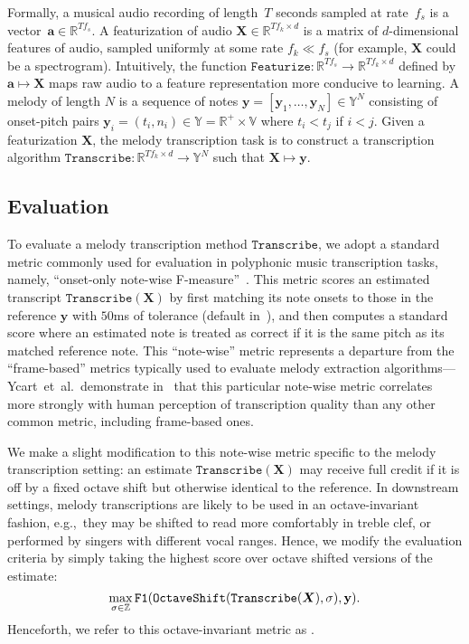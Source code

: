 Formally, a musical audio recording of length~$T$ seconds sampled at rate~$f_s$ is a vector~${\bm{a} \in \mathbb{R}^{Tf_s}}$. 
A featurization of audio ${\bm{X} \in \mathbb{R}^{Tf_k \times d}}$ is a matrix of $d$-dimensional features of audio, sampled uniformly at some rate ${f_k \ll f_s}$ (for example, $\bm{X}$ could be a spectrogram).
Intuitively, the function ${\texttt{Featurize} : \mathbb{R}^{Tf_s} \to \mathbb{R}^{Tf_k \times d}}$ defined by ${\bm{a} \mapsto \bm{X}}$ maps 
raw audio to a feature representation more conducive to learning. 
A melody of length $N$ is a sequence of notes 
$\bm{y} = [\bm{y}_1,\dots,\bm{y}_N] \in \mathbb{Y}^N$
consisting of onset-pitch pairs ${\bm{y}_i = (t_i,n_i)} \in \mathbb{Y} = \mathbb{R}^+ \times \mathbb{V}$ where ${t_i < t_j}$ if ${i < j}$. Given a featurization $\bm{X}$, the melody transcription task is to construct a transcription algorithm ${\texttt{Transcribe} : \mathbb{R}^{Tf_k \times d} \to \mathbb{Y}^N}$ such that ${\bm{X} \mapsto \bm{y}}$.

\subsection{Evaluation}
\label{sec:eval}

To evaluate a melody transcription method $\texttt{Transcribe}$, 
we adopt a standard metric commonly used for evaluation in polyphonic music transcription tasks, namely,  ``onset-only note-wise F-measure''~\cite{ycart2020investigating}. 
This metric scores an estimated transcript $\texttt{Transcribe}(\bm{X})$ by first matching its note onsets to those in the reference $\bm{y}$ with $50$ms of tolerance (default in~\cite{raffel2014eval}), and then computes a standard \fone{} score where an estimated note is treated as correct if it is the same pitch as its matched reference note. 
This ``note-wise'' metric represents a departure from the ``frame-based'' metrics typically used to evaluate melody extraction algorithms---Ycart~et~al.\ demonstrate in~\cite{ycart2020investigating} that this particular note-wise metric correlates more strongly with human perception of transcription quality than any other common metric, including frame-based ones.

We make a slight modification to this note-wise metric 
specific to the melody transcription setting: an estimate $\texttt{Transcribe}(\bm{X})$ may receive full credit if it is off by a fixed octave shift but otherwise identical to the reference. 
In downstream settings, melody transcriptions are likely to be used in an octave-invariant fashion, e.g.,~they may be shifted to read more comfortably in treble clef, or performed by singers with different vocal ranges. 
Hence, we modify the evaluation criteria by simply taking the highest score over octave shifted versions of the estimate:
\begin{equation*}
    \max_{\sigma \in \mathbb{Z}} \texttt{\texttt{F1}}(\texttt{OctaveShift}(\texttt{Transcribe}(\mbox{\boldmath{$X$}}), \sigma), \mathbf{y}).
\end{equation*}
Henceforth, we refer to this octave-invariant metric as \fone. 